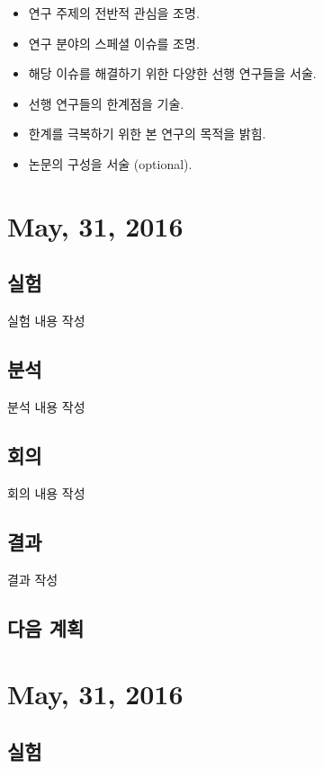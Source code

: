 \documentclass{research-note-v1.0}
\begin{document}
	\begin{itemize}
		\item{연구 주제의 전반적 관심을 조명.}
		\item{연구 분야의 스페셜 이슈를 조명.}
		\item{해당 이슈를 해결하기 위한 다양한 선행 연구들을 서술.}
		\item{선행 연구들의 한계점을 기술.}
		\item{한계를 극복하기 위한 본 연구의 목적을 밝힘.}
		\item{논문의 구성을 서술 (optional).}
	\end{itemize}


\section*{May, 31, 2016}

\subsection*{실험}

실험 내용 작성

\subsection*{분석}

 분석 내용 작성

\subsection*{회의}

회의 내용 작성

\subsection*{결과}

결과 작성


\subsection*{다음 계획}




\section*{May, 31, 2016}

\subsection*{실험}
\end{document}
